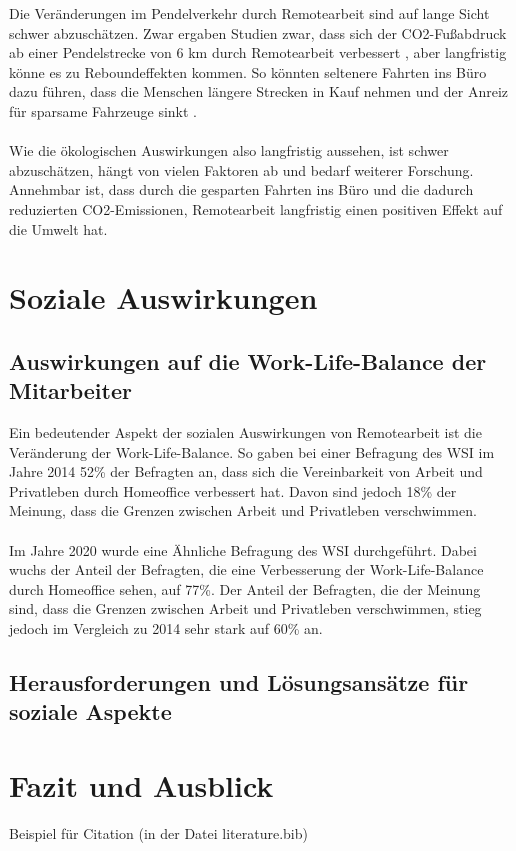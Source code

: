 \documentclass[runningheads]{llncs}
\begin{document}
Die Veränderungen im Pendelverkehr durch Remotearbeit sind auf lange Sicht schwer abzuschätzen.
Zwar ergaben Studien zwar, dass sich der CO2-Fußabdruck ab einer Pendelstrecke von 6 km durch Remotearbeit verbessert \cite{daniel_crow_working_2022}, aber langfristig könne es zu Reboundeffekten kommen.
So könnten seltenere Fahrten ins Büro dazu führen, dass die Menschen längere Strecken in Kauf nehmen und der Anreiz für sparsame Fahrzeuge sinkt \cite{waldemar_marz_reduziert_2022}.\\\\
Wie die ökologischen Auswirkungen also langfristig aussehen, ist schwer abzuschätzen, hängt von vielen Faktoren ab und bedarf weiterer Forschung.
Annehmbar ist, dass durch die gesparten Fahrten ins Büro und die dadurch reduzierten CO2-Emissionen, Remotearbeit langfristig einen positiven Effekt auf die Umwelt hat.

\section{Soziale Auswirkungen}

\subsection{Auswirkungen auf die Work-Life-Balance der Mitarbeiter}

Ein bedeutender Aspekt der sozialen Auswirkungen von Remotearbeit ist die Veränderung der Work-Life-Balance. So gaben bei einer Befragung des WSI im Jahre 2014 52\% der Befragten an, dass sich die Vereinbarkeit von Arbeit und Privatleben durch Homeoffice verbessert hat. Davon sind jedoch 18\% der Meinung, dass die Grenzen zwischen Arbeit und Privatleben verschwimmen.
\\\\
Im Jahre 2020 wurde eine Ähnliche Befragung des WSI durchgeführt. Dabei wuchs der Anteil der Befragten, die eine Verbesserung der Work-Life-Balance durch Homeoffice sehen, auf 77\%. Der Anteil der Befragten, die der Meinung sind, dass die Grenzen zwischen Arbeit und Privatleben verschwimmen, stieg jedoch im Vergleich zu 2014 sehr stark auf 60\% an.


\subsection{Herausforderungen und Lösungsansätze für soziale Aspekte}


\section{Fazit und Ausblick}

Beispiel für Citation\cite{noauthor_internet-konferenz_2021}
(in der Datei literature.bib)




\end{document}
